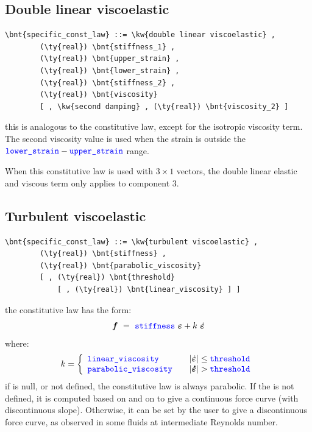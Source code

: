 \subsection{Double linear viscoelastic}
\begin{Verbatim}[commandchars=\\\{\}]
    \bnt{specific_const_law} ::= \kw{double linear viscoelastic} ,
        (\ty{real}) \bnt{stiffness_1} ,
        (\ty{real}) \bnt{upper_strain} ,
        (\ty{real}) \bnt{lower_strain} ,
        (\ty{real}) \bnt{stiffness_2} ,
        (\ty{real}) \bnt{viscosity}
        [ , \kw{second damping} , (\ty{real}) \bnt{viscosity_2} ]
\end{Verbatim}
this is analogous to the  constitutive law,
except for the isotropic viscosity term.
The second viscosity value is used when the strain is outside the
$\nt{lower\_strain} - \nt{upper\_strain}$ range.

When this constitutive law is used with $3 \times 1$ vectors, 
the double linear elastic and viscous term only applies to component 3.
  
\subsection{Turbulent viscoelastic}
\begin{Verbatim}[commandchars=\\\{\}]
    \bnt{specific_const_law} ::= \kw{turbulent viscoelastic} ,
        (\ty{real}) \bnt{stiffness} ,
        (\ty{real}) \bnt{parabolic_viscosity}
        [ , (\ty{real}) \bnt{threshold}
            [ , (\ty{real}) \bnt{linear_viscosity} ] ]
\end{Verbatim}
the constitutive law has the form:
\begin{displaymath}
    \T{f} \ = \ \nt{stiffness} \ \T{\varepsilon} + k \ \dot{\T{\varepsilon}}
\end{displaymath}
where:
\begin{displaymath}
    k = \lcubr{\matr{lcr}{
        \nt{linear\_viscosity} & & 
            \shbr{\dot{\T{\varepsilon}}} \leq \nt{threshold} \\
        \nt{parabolic\_viscosity} & &
            \shbr{\T{\dot{\varepsilon}}} > \nt{threshold}
    }}
\end{displaymath}
if  is null, or not defined, the constitutive law is always
parabolic. If the  is not defined, it is
computed based on  and on 
 to give a continuous force curve (with discontinuous slope).
Otherwise, it can be set by the user to give a discontinuous force curve,
as observed in some fluids at intermediate Reynolds number.

